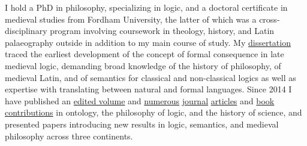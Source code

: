 I hold a PhD in philosophy, specializing in logic, and a doctoral certificate in medieval studies from Fordham University, the latter of which was a cross-disciplinary program involving coursework in theology, history, and Latin palaeography outside in addition to my main course of study. 
My \href{https://www.academia.edu/32939933/The_development_of_the_medieval_Parisian_account_of_formal_consequence}{dissertation} traced the earliest development of the concept of formal consequence
in late medieval logic, demanding 
broad knowledge 
of the history of philosophy, 
of medieval Latin, 
and 
of semantics for classical and non-classical logics 
as well as  
expertise with translating between natural and formal languages. 
Since 2014 I have published an \href{https://brill.com/view/journals/viv/56/3-4/viv.56.issue-3-4.xml?language=en}{edited volume} and  
\href{https://link.springer.com/article/10.1007/s11787-019-00229-x}{numerous} \href{https://link.springer.com/article/10.1007/s11787-017-0162-7}{journal} \href{https://www.jstor.org/stable/43658430}{articles} and  \href{https://www.cambridgescholars.com/download/sample/64716}{book} \href{http://www.collegepublications.co.uk/dialogues/?00005}{contributions}
in 
ontology, 
the philosophy of logic, 
and the history of science, 
and presented papers introducing new results in logic, semantics, and medieval philosophy across three continents.
